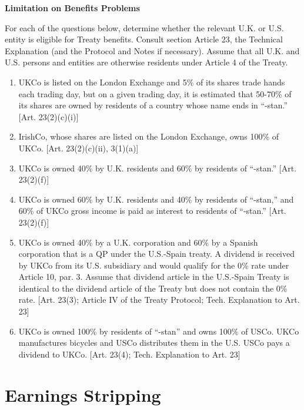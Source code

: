 	\begin{center}
		\textbf{Limitation on Benefits Problems}
	\end{center}
	\begin{select}
	
For each of the questions below, determine whether the relevant U.K. or U.S. entity is eligible for Treaty benefits.  Consult section Article 23, the Technical Explanation (and the  Protocol and Notes if necessary).  Assume that all U.K. and U.S. persons and entities are otherwise residents under Article 4 of the Treaty.  

	\begin{enumerate}
		\item UKCo is listed on the London Exchange and 5\% of its shares trade hands each trading day, but on a given trading day, it is estimated that 50-70\% of its shares are owned by residents of a country whose name ends in ``-stan.''  [Art. 23(2)(c)(i)]
		\item IrishCo, whose shares are listed on the London Exchange, owns 100\% of UKCo. [Art. 23(2)(c)(ii), 3(1)(a)]
		\item UKCo is owned 40\% by U.K. residents and 60\% by residents of ``-stan.'' [Art. 23(2)(f)]
			\item UKCo is owned 60\% by U.K. residents and 40\% by residents of ``-stan,'' and 60\% of UKCo gross income is paid as interest to residents of ``-stan.''  [Art. 23(2)(f)]
			\item UKCo is owned 40\% by a U.K. corporation and 60\% by a Spanish corporation that is a QP under the U.S.-Spain treaty.  A dividend is received by UKCo from its U.S. subsidiary and would qualify for the 0\% rate under Article 10, par. 3.  Assume that dividend article in the U.S.-Spain Treaty is identical to the dividend article of the Treaty but does not contain the 0\% rate.  [Art. 23(3); Article IV of the Treaty Protocol; Tech. Explanation to Art. 23]
			\item UKCo is owned 100\% by residents of ``-stan'' and owns 100\% of USCo.  UKCo manufactures bicycles and USCo distributes them in the U.S.  USCo pays a dividend to UKCo.  [Art. 23(4); Tech. Explanation to Art. 23]  
				\end{enumerate}
	\end{select}

\section{Earnings Stripping}

